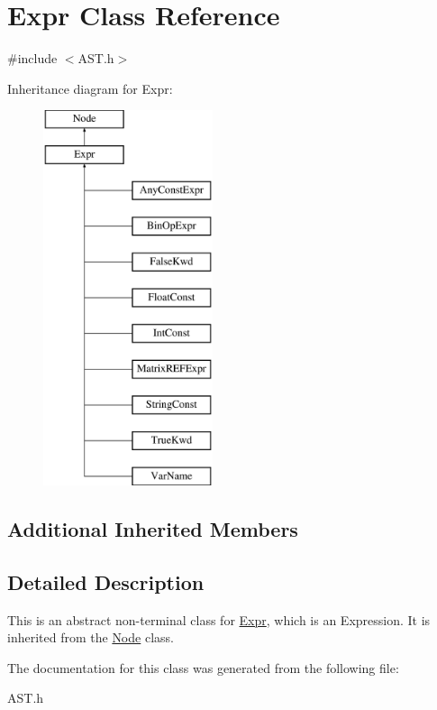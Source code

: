 \hypertarget{class_expr}{}\section{Expr Class Reference}
\label{class_expr}


{\ttfamily \#include $<$A\+S\+T.\+h$>$}

Inheritance diagram for Expr\+:\begin{figure}[H]
\begin{center}
\leavevmode
\includegraphics[height=11.000000cm]{class_expr}
\end{center}
\end{figure}
\subsection*{Additional Inherited Members}


\subsection{Detailed Description}
This is an abstract non-\/terminal class for \hyperlink{class_expr}{Expr}, which is an Expression. It is inherited from the \hyperlink{class_node}{Node} class. 

The documentation for this class was generated from the following file\+:\begin{DoxyCompactItemize}
\item 
A\+S\+T.\+h\end{DoxyCompactItemize}
